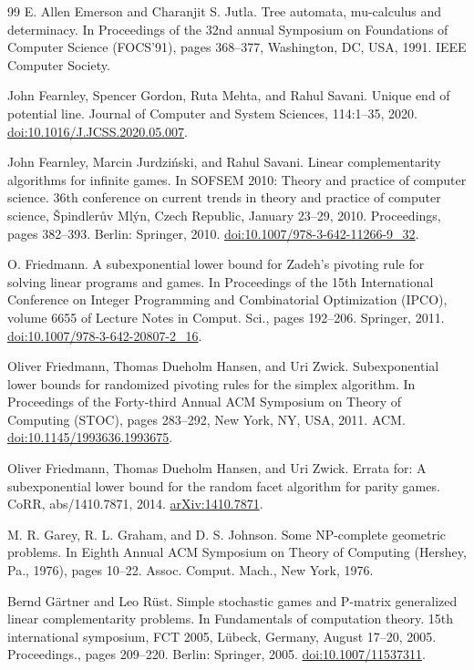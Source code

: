\documentclass[10pt,a4paper]{article}
\theoremstyle{definition}
\begin{document}
\begin{thebibliography}{99}
 E. Allen Emerson and Charanjit S. Jutla. Tree automata, mu-calculus and determinacy. In Proceedings of the 32nd annual Symposium on Foundations of Computer Science (FOCS’91), pages 368–377, Washington, DC, USA, 1991. IEEE Computer Society.

 John Fearnley, Spencer Gordon, Ruta Mehta, and Rahul Savani. Unique end of potential line. Journal of Computer and System Sciences, 114:1–35, 2020. \href{https://doi.org/10.1016/J.JCSS.2020.05.007}{doi:10.1016/J.JCSS.2020.05.007}.

 John Fearnley, Marcin Jurdziński, and Rahul Savani. Linear complementarity algorithms for infinite games. In SOFSEM 2010: Theory and practice of computer science. 36th conference on current trends in theory and practice of computer science, Špindlerův Mlýn, Czech Republic, January 23–29, 2010. Proceedings, pages 382–393. Berlin: Springer, 2010. \href{https://doi.org/10.1007/978-3-642-11266-9_32}{doi:10.1007/978-3-642-11266-9\_32}.

 O. Friedmann. A subexponential lower bound for Zadeh’s pivoting rule for solving linear programs and games. In Proceedings of the 15th International Conference on Integer Programming and Combinatorial Optimization (IPCO), volume 6655 of Lecture Notes in Comput. Sci., pages 192–206. Springer, 2011. \href{https://doi.org/10.1007/978-3-642-20807-2_16}{doi:10.1007/978-3-642-20807-2\_16}.

 Oliver Friedmann, Thomas Dueholm Hansen, and Uri Zwick. Subexponential lower bounds for randomized pivoting rules for the simplex algorithm. In Proceedings of the Forty-third Annual ACM Symposium on Theory of Computing (STOC), pages 283–292, New York, NY, USA, 2011. ACM. \href{https://doi.org/10.1145/1993636.1993675}{doi:10.1145/1993636.1993675}.

 Oliver Friedmann, Thomas Dueholm Hansen, and Uri Zwick. Errata for: A subexponential lower bound for the random facet algorithm for parity games. CoRR, abs/1410.7871, 2014. \href{https://arxiv.org/abs/1410.7871}{arXiv:1410.7871}.

 M. R. Garey, R. L. Graham, and D. S. Johnson. Some NP-complete geometric problems. In Eighth Annual ACM Symposium on Theory of Computing (Hershey, Pa., 1976), pages 10–22. Assoc. Comput. Mach., New York, 1976.

 Bernd Gärtner and Leo Rüst. Simple stochastic games and P-matrix generalized linear complementarity problems. In Fundamentals of computation theory. 15th international symposium, FCT 2005, Lübeck, Germany, August 17–20, 2005. Proceedings., pages 209–220. Berlin: Springer, 2005. \href{https://doi.org/10.1007/11537311}{doi:10.1007/11537311}.


\end{thebibliography}
\end{document}
